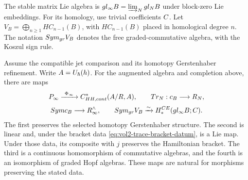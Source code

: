The stable matrix Lie algebra is
$\mathfrak{gl}_\infty B=\varinjlim_N\mathfrak{gl}_N B$
under block-zero Lie embeddings.
For its homology, use trivial coefficients $\C$.
Let $V_B=\bigoplus_{n\ge1}HC_{n-1}(B)$, with $HC_{n-1}(B)$ placed
in homological degree $n$.
The notation $\Sym_{\mathrm{gr}}V_B$ denotes the free graded-commutative
algebra, with the Koszul sign rule.

\begin{theorem}
Assume the compatible jet comparison and its homotopy Gerstenhaber refinement.
Write $\mathcal A=\widehat U_\hbar(\h)$.
For the augmented algebra and completion above, there are maps
\[
 \mathcal P_\infty
 \xrightarrow{\ \Phi_\infty\ }
 C^*_{\HH,\mathrm{cont}}(\mathcal A/R,\mathcal A),
 \qquad
 \operatorname{Tr}_N:\mathfrak c_B\longrightarrow\mathcal R_N,
\]
\[
 \widehat\Sym\overline{\mathfrak c}_B
 \longrightarrow\mathcal R_\infty^{\wedge},
 \qquad
 \Sym_{\mathrm{gr}}V_B
 \xrightarrow{\sim}
 H_*^{\CE}(\mathfrak{gl}_\infty B;\C).
\]
The first preserves the selected homotopy Gerstenhaber structure.
The second is linear and, under the bracket data
\eqref{eq:vol2-trace-bracket-datum}, is a Lie map.
Under those data, its composite with $j$ preserves the Hamiltonian bracket.
The third is a continuous homomorphism of commutative algebras,
and the fourth is an isomorphism of graded Hopf algebras.
These maps are natural for morphisms preserving the stated data.
\end{theorem}
